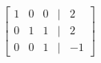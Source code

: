 \documentclass[preview]{standalone}
\begin{document}
\begin{align*}
\begin{bmatrix} 1 & 0 & 0 & | & 2 \\ 0 & 1 & 1 & | & 2 \\ 0 & 0 & 1 & | & -1 \end{bmatrix}\\
\end{align*}
\end{document}
